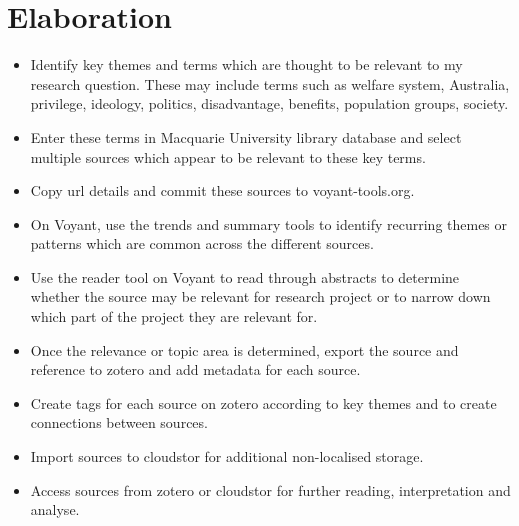\documentclass{article}
\begin{document}
\section{Elaboration}
\begin{itemize}
    \item Identify key themes and terms which are thought to be relevant to my research question. These may include terms such as welfare system, Australia, privilege, ideology, politics, disadvantage, benefits, population groups, society.
    \item Enter these terms in Macquarie University library database and select multiple sources which appear to be relevant to these key terms. \item Copy url details and commit these sources to  voyant-tools.org. 
    \item On Voyant, use the trends and summary tools to identify recurring themes or patterns which are common across the different sources. 
    \item Use the reader tool on Voyant to read through abstracts to determine whether the source may be relevant for research project or to narrow down which part of the project they are relevant for.
    \item Once the relevance or topic area is determined, export the source and reference to zotero and add metadata for each source.
    \item Create tags for each source on zotero according to key themes and to create connections between sources.
    \item Import sources to cloudstor for additional non-localised storage.
    \item Access sources from zotero or cloudstor for further reading, interpretation and analyse. 
\end{itemize}
\end{document}
